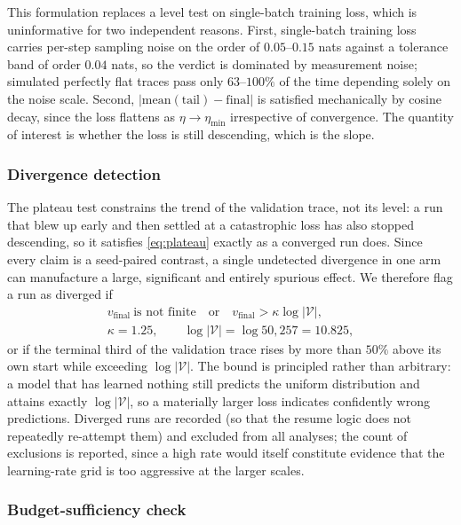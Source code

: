 \documentclass[final,5p,times,twocolumn]{elsarticle}
\theoremstyle{remark}
\begin{document}
This formulation replaces a level test on single-batch training loss, which is
uninformative for two independent reasons. First, single-batch training loss
carries per-step sampling noise on the order of $0.05$--$0.15$ nats against a
tolerance band of order $0.04$ nats, so the verdict is dominated by measurement
noise; simulated perfectly flat traces pass only $63$--$100\%$ of the time
depending solely on the noise scale. Second, $|\mathrm{mean(tail)} -
\mathrm{final}|$ is satisfied mechanically by cosine decay, since the
loss flattens as $\eta \to \eta_{\min}$ irrespective of convergence. The
quantity of interest is whether the loss is still descending, which is the
slope.

\subsubsection{Divergence detection}

The plateau test constrains the trend of the validation trace, not its
level: a run that blew up early and then settled at a catastrophic loss has
also stopped descending, so it satisfies \eqref{eq:plateau} exactly as a
converged run does. Since every claim is a seed-paired contrast, a single
undetected divergence in one arm can manufacture a large, significant and
entirely spurious effect. We therefore flag a run as diverged if
\begin{equation}
\label{eq:diverge}
\begin{gathered}
v_{\mathrm{final}}\ \text{is not finite}
\quad\text{or}\quad
v_{\mathrm{final}} > \kappa \log|\mathcal{V}|,\\[0.4ex]
\kappa = 1.25,\qquad \log|\mathcal{V}| = \log 50{,}257 = 10.825,
\end{gathered}
\end{equation}
or if the terminal third of the validation trace rises by more than $50\%$ above
its own start while exceeding $\log|\mathcal{V}|$. The bound is principled
rather than arbitrary: a model that has learned nothing still predicts the
uniform distribution and attains exactly $\log|\mathcal{V}|$, so a materially
larger loss indicates confidently wrong predictions. Diverged runs are recorded
(so that the resume logic does not repeatedly re-attempt them) and excluded from
all analyses; the count of exclusions is reported, since a high rate would
itself constitute evidence that the learning-rate grid is too aggressive at the
larger scales.

\subsubsection{Budget-sufficiency check}
\end{document}
